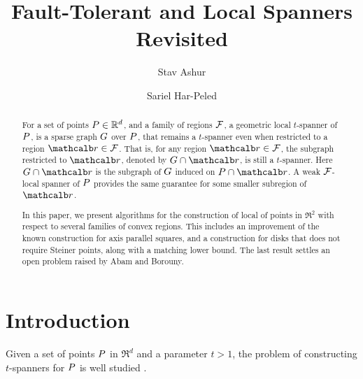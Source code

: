 \documentclass[12pt]{article}%
\begin{document}
\title{Fault-Tolerant and Local Spanners Revisited}

\author{%
   Stav Ashur%
   \StavThanks{}%
   \and%
   Sariel Har-Peled%
}%

\maketitle



\begin{abstract}
    For a set of points $P\in \mathbb{R}^d$, and a family of regions $\mathcal{F}$,
    a geometric local $t$-spanner of $P$, is a sparse graph $G$
    over $P$, that remains a $t$-spanner even when restricted to a
    region $\region \in \FF$. That is, for any region
    $\region \in \FF$, the subgraph restricted to $\region$, denoted
    by $\restrictY{\G}{\region}$, is still a $t$-spanner. Here
    $\restrictY{\G}{\region}$ is the subgraph of $G$ induced on
    $\PS \cap \region$.  A weak $\mathcal{F}$-local spanner of $P$
    provides the same guarantee for some smaller subregion of
    $\region$.

    In this paper, we present algorithms for the construction of local
    of points in $\Re^2$ with respect to several families of convex
    regions. This includes an improvement of the known construction
    for axis parallel squares, and a construction for disks that does
    not require Steiner points, along with a matching lower bound. The
    last result settles an open problem raised by Abam and Borouny.
\end{abstract}



\section{Introduction}

Given a set of points $P$ in $\Re^d$ and a parameter $t>1$, the
problem of constructing $t$-spanners for $P$ is well studied
\cite{ns-gsn-07}.
\end{document}
